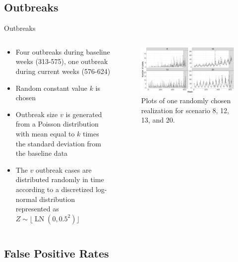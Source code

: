 \documentclass[aspectratio=169]{beamer}
\DeclareMathOperator{\LN}{LN}
\begin{document}
\hypertarget{outbreaks}{%
\subsection{Outbreaks}\label{outbreaks}}

\begin{frame}{Outbreaks}
\begin{columns}
\begin{column}{.50\textwidth}
\begin{itemize}
  \item Four outbreaks during baseline weeks (313-575), one outbreak during current weeks (576-624)
  \item Random constant value $k$ is chosen
  \item Outbreak size $v$ is generated from a Poisson distribution with mean equal to $k$ times the standard deviation from the baseline data
  \item The $v$ outbreak cases are distributed randomly in time according to a discretized log-normal distribution represented as $Z \sim \lfloor \LN(0,0.5^2)\rfloor$
\end{itemize}
\end{column}
\hfill
\begin{column}{.46\textwidth}

 \tiny

\begin{figure}[H]
\includegraphics[width=1\linewidth]{../figures/Realizations} \caption{Plots of one randomly chosen realization for scenario 8, 12, 13, and 20.}\label{fig:Realizations}
\end{figure}

 \normalsize
\end{column}
\end{columns}
\end{frame}

\hypertarget{false-positive-rates}{%
\subsection{False Positive Rates}\label{false-positive-rates}}
\end{document}
